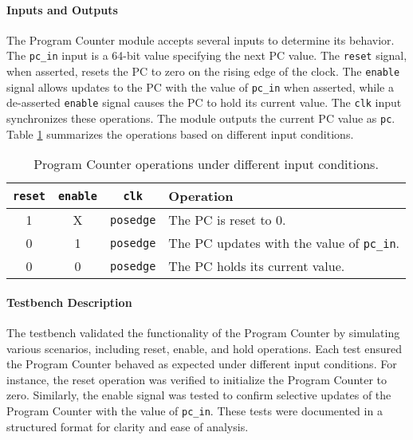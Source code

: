 \documentclass[12pt]{article}
\begin{document}
\paragraph{Inputs and Outputs}
The Program Counter module accepts several inputs to determine its behavior. The \texttt{pc\_in} input is a 64-bit value specifying the next PC value. The \texttt{reset} signal, when asserted, resets the PC to zero on the rising edge of the clock. The \texttt{enable} signal allows updates to the PC with the value of \texttt{pc\_in} when asserted, while a de-asserted \texttt{enable} signal causes the PC to hold its current value. The \texttt{clk} input synchronizes these operations. The module outputs the current PC value as \texttt{pc}. Table \ref{tab:pc_operations} summarizes the operations based on different input conditions.

\begin{table}[ht!]
    \centering
    \renewcommand{\arraystretch}{1.1}
    \setlength{\tabcolsep}{4pt}
    \begin{tabular}{|c|c|c|l|}
        \hline
        \textbf{\texttt{reset}} & \textbf{\texttt{enable}} & \textbf{\texttt{clk}} & \textbf{Operation} \\
        \hline
        1 & X & \texttt{posedge} & The PC is reset to 0. \\
        0 & 1 & \texttt{posedge} & The PC updates with the value of \texttt{pc\_in}. \\
        0 & 0 & \texttt{posedge} & The PC holds its current value. \\
        \hline
    \end{tabular}
    \caption{Program Counter operations under different input conditions.}
    \label{tab:pc_operations}
\end{table}

\paragraph{Testbench Description}
The testbench validated the functionality of the Program Counter by simulating various scenarios, including reset, enable, and hold operations. Each test ensured the Program Counter behaved as expected under different input conditions. For instance, the reset operation was verified to initialize the Program Counter to zero. Similarly, the enable signal was tested to confirm selective updates of the Program Counter with the value of \texttt{pc\allowbreak\_in}. These tests were documented in a structured format for clarity and ease of analysis.
\end{document}
